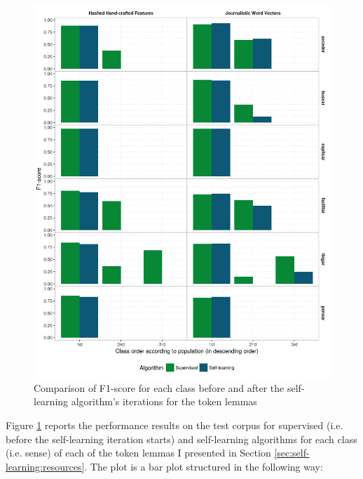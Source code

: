 \begin{figure}[htb!]
  \centering
  \includegraphics[height=.9\textheight,width=\textwidth,keepaspectratio]
    {plots/selflearning/per_sense_fscore}
  \caption{Comparison of F1-score for each class before and after the
  self-learning algorithm's iterations for the token lemmas}
  \label{fig:self-learning:per_class_performance}
\end{figure}

Figure \ref{fig:self-learning:per_class_performance} reports the performance
results on the test corpus for supervised (i.e. before the self-learning
iteration starts) and self-learning algorithms for each class (i.e. sense) of
each of the token lemmas I presented in Section
\ref{sec:self-learning:resources}. The plot is a bar plot structured in the
following way:


